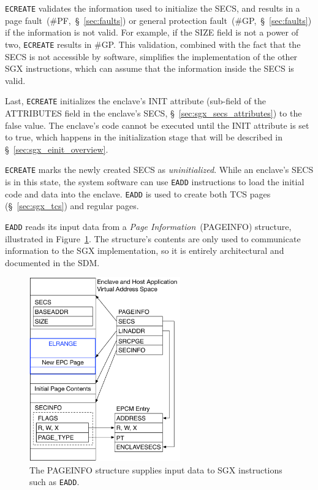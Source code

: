 \texttt{ECREATE} validates the information used to initialize the SECS, and
results in a page fault~(\#PF,~\S~\ref{sec:faults}) or general protection
fault~(\#GP,~\S~\ref{sec:faults}) if the information is not valid. For example,
if the SIZE field is not a power of two, \texttt{ECREATE} results in \#GP. This
validation, combined with the fact that the SECS is not accessible by software,
simplifies the implementation of the other SGX instructions, which can assume
that the information inside the SECS is valid.

Last, \texttt{ECREATE} initializes the enclave's INIT attribute (sub-field of
the ATTRIBUTES field in the enclave's SECS, \S~\ref{sec:sgx_secs_attributes})
to the false value. The enclave's code cannot be executed until the INIT
attribute is set to true, which happens in the initialization stage that will
be described in \S~\ref{sec:sgx_einit_overview}.


\label{sec:sgx_eadd}

\texttt{ECREATE} marks the newly created SECS as \textit{uninitialized}. While
an enclave's SECS is in this state, the system software can use \texttt{EADD}
instructions to load the initial code and data into the enclave. \texttt{EADD}
is used to create both TCS pages (\S~\ref{sec:sgx_tcs}) and regular pages.


\texttt{EADD} reads its input data from a \textit{Page Information}~(PAGEINFO)
structure, illustrated in Figure~\ref{fig:sgx_pageinfo}. The structure's
contents are only used to communicate information to the SGX implementation, so
it is entirely architectural and documented in the SDM.

\begin{figure}[hbt]
  \centering
  \includegraphics[width=65mm]{figures/sgx_pageinfo.pdf}
  \caption{
    The PAGEINFO structure supplies input data to SGX instructions such as
    \texttt{EADD}.
  }
  \label{fig:sgx_pageinfo}
\end{figure}

